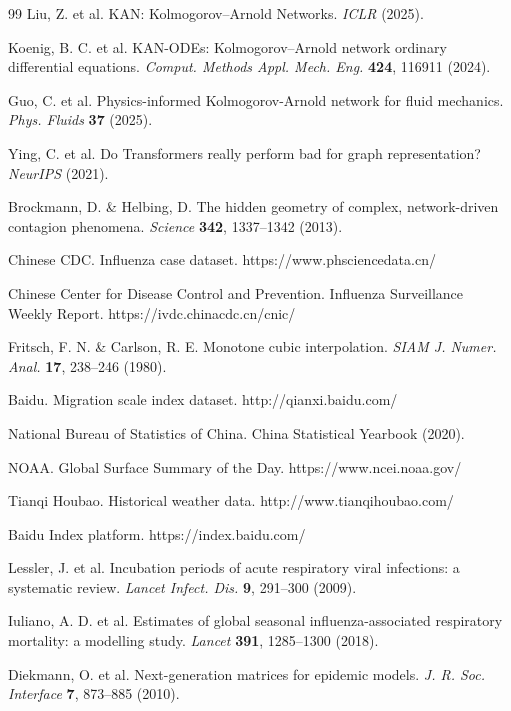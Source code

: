 \documentclass[10pt,letterpaper]{article}
\begin{document}
\begin{thebibliography}{99}
		Liu, Z. et al. KAN: Kolmogorov–Arnold Networks. 
		\textit{ICLR} (2025).
		
		Koenig, B. C. et al. KAN-ODEs: Kolmogorov–Arnold network ordinary differential equations. 
		\textit{Comput. Methods Appl. Mech. Eng.} \textbf{424}, 116911 (2024).
		
		Guo, C. et al. Physics-informed Kolmogorov-Arnold network for fluid mechanics. 
		\textit{Phys. Fluids} \textbf{37} (2025).
		
		Ying, C. et al. Do Transformers really perform bad for graph representation? 
		\textit{NeurIPS} (2021).
		
		Brockmann, D. \& Helbing, D. The hidden geometry of complex, network-driven contagion phenomena. 
		\textit{Science} \textbf{342}, 1337–1342 (2013).
		
		Chinese CDC. Influenza case dataset. https://www.phsciencedata.cn/
		
		Chinese Center for Disease Control and Prevention. Influenza Surveillance Weekly Report. 
		https://ivdc.chinacdc.cn/cnic/
		
		Fritsch, F. N. \& Carlson, R. E. Monotone cubic interpolation. 
		\textit{SIAM J. Numer. Anal.} \textbf{17}, 238–246 (1980).
		
		Baidu. Migration scale index dataset. http://qianxi.baidu.com/
		
		National Bureau of Statistics of China. China Statistical Yearbook (2020).
		
		NOAA. Global Surface Summary of the Day. https://www.ncei.noaa.gov/
		
		Tianqi Houbao. Historical weather data. http://www.tianqihoubao.com/
		
		Baidu Index platform. https://index.baidu.com/
		
		Lessler, J. et al. Incubation periods of acute respiratory viral infections: a systematic review. 
		\textit{Lancet Infect. Dis.} \textbf{9}, 291–300 (2009).
		
		Iuliano, A. D. et al. Estimates of global seasonal influenza-associated respiratory mortality: a modelling study. 
		\textit{Lancet} \textbf{391}, 1285–1300 (2018).
		
		Diekmann, O. et al. Next-generation matrices for epidemic models. 
		\textit{J. R. Soc. Interface} \textbf{7}, 873–885 (2010).
		

\end{thebibliography}
\end{document}

